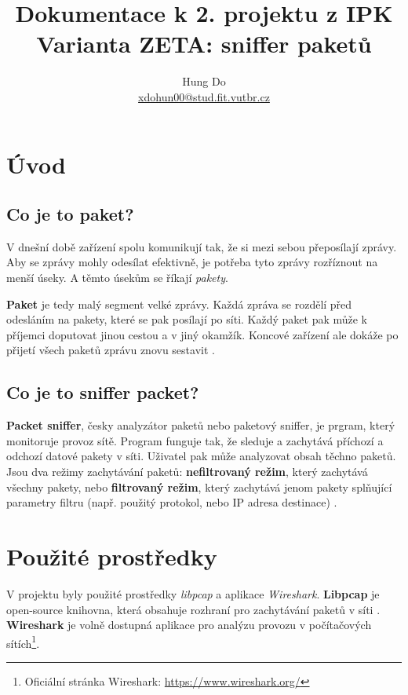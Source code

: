 \documentclass[a4paper,11pt]{article}
\title{Dokumentace k 2. projektu z IPK \\
        \large Varianta ZETA: sniffer paketů}
\author{Hung Do \\ \href{mailto:xdohun00@stud.fit.vutbr.cz}{xdohun00@stud.fit.vutbr.cz}}
\begin{document}
    \maketitle
    \thispagestyle{empty}
    \newpage
    \tableofcontents
    \newpage
    \section{Úvod}
    \subsection{Co je to paket?}
    \label{sec:CoJeToPaket}
    V dnešní době zařízení spolu komunikují tak, že si mezi sebou přeposílají zprávy. 
    Aby se zprávy mohly odesílat efektivně, je potřeba tyto zprávy rozříznout na menší úseky.
    A těmto úsekům se říkají \emph{pakety}.

    \textbf{Paket} je tedy malý segment velké zprávy. Každá zpráva se rozdělí před odesláním na pakety, které se pak posílají po síti.
    Každý paket pak může k příjemci doputovat jinou cestou a v jiný okamžík. Koncové zařízení ale dokáže po přijetí všech paketů zprávu znovu sestavit \cite{ComputerNetworking}.
     
    \subsection{Co je to sniffer packet?}
    \textbf{Packet sniffer}, česky analyzátor paketů nebo paketový sniffer, je prgram, který monitoruje provoz sítě.
    Program funguje tak, že sleduje a zachytává příchozí a odchozí datové pakety v síti. 
    Uživatel pak může analyzovat obsah těchno paketů. Jsou dva režimy zachytávání paketů: \textbf{nefiltrovaný režim}, který zachytává všechny pakety, 
    nebo \textbf{filtrovaný režim}, který zachytává jenom pakety splňující parametry filtru (např. použitý protokol, nebo IP adresa destinace) \cite{KasperskyPacketSniffer}.

    \section{Použité prostředky}
    V projektu byly použité prostředky \emph{libpcap} a aplikace \emph{Wireshark}. 
    \textbf{Libpcap} je open-source knihovna, která obsahuje rozhraní pro zachytávání paketů v síti \cite{LibpcapPage}.
    \textbf{Wireshark} je volně dostupná aplikace pro analýzu provozu v počítačových sítích\footnote{Oficiální stránka Wireshark: \url{https://www.wireshark.org/}}. 
\end{document}
